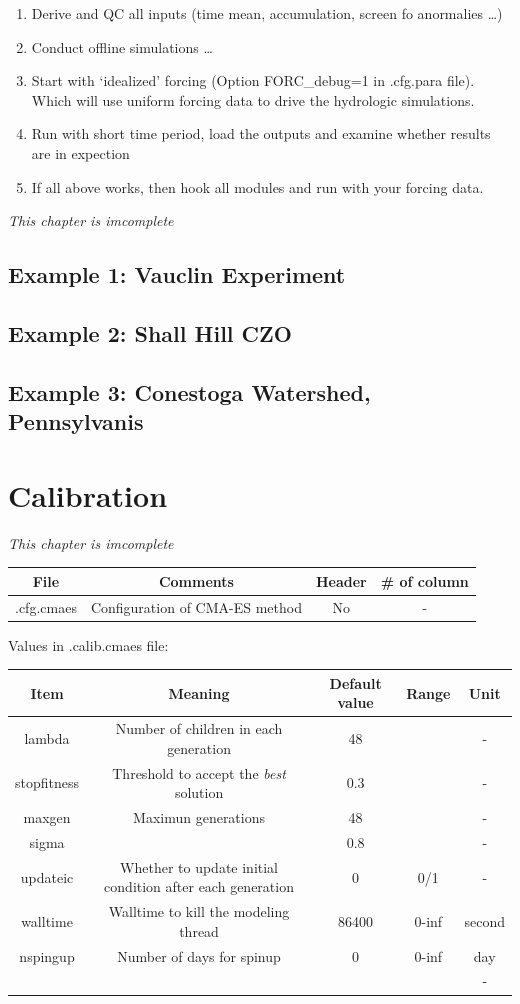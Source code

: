\documentclass[]{scrbook}
\providecommand{\tightlist}{%
  \setlength{\itemsep}{0pt}\setlength{\parskip}{0pt}}
\begin{document}
\begin{enumerate}
\def\labelenumi{\arabic{enumi}.}
\tightlist
\item
  Derive and QC all inputs (time mean, accumulation, screen fo
  anormalies \ldots{})
\item
  Conduct offline simulations \ldots{}
\item
  Start with `idealized' forcing (Option FORC\_debug=1 in .cfg.para
  file). Which will use uniform forcing data to drive the hydrologic
  simulations.
\item
  Run with short time period, load the outputs and examine whether
  results are in expection
\item
  If all above works, then hook all modules and run with your forcing
  data.
\end{enumerate}

\emph{This chapter is imcomplete}

\section{Example 1: Vauclin
Experiment}\label{example-1-vauclin-experiment}

\section{Example 2: Shall Hill CZO}\label{example-2-shall-hill-czo}

\section{Example 3: Conestoga Watershed,
Pennsylvanis}\label{example-3-conestoga-watershed-pennsylvanis}

\chapter{Calibration}\label{calibration}

\emph{This chapter is imcomplete}

\begin{longtable}[]{@{}cccc@{}}
\toprule
File & Comments & Header & \# of column\tabularnewline
\midrule
\endhead
.cfg.cmaes & Configuration of CMA-ES method & No & -\tabularnewline
\bottomrule
\end{longtable}

Values in .calib.cmaes file:

\begin{longtable}[]{@{}ccccc@{}}
\toprule
Item & Meaning & Default value & Range & Unit\tabularnewline
\midrule
\endhead
lambda & Number of children in each generation & 48 & & -\tabularnewline
stopfitness & Threshold to accept the \emph{best} solution & 0.3 & &
-\tabularnewline
maxgen & Maximun generations & 48 & & -\tabularnewline
sigma & & 0.8 & & -\tabularnewline
updateic & Whether to update initial condition after each generation & 0
& 0/1 & -\tabularnewline
walltime & Walltime to kill the modeling thread & 86400 & 0-inf &
second\tabularnewline
nspingup & Number of days for spinup & 0 & 0-inf & day\tabularnewline
& & & & -\tabularnewline
\bottomrule
\end{longtable}
\end{document}
